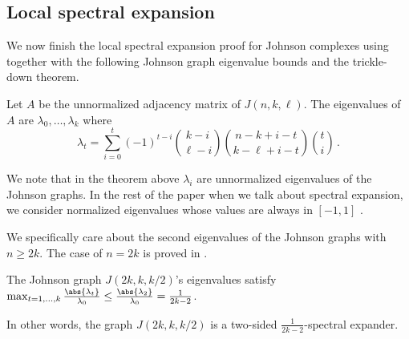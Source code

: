 



\subsection{Local spectral expansion}
We now finish the local spectral expansion proof for Johnson complexes using  together with the following Johnson graph eigenvalue bounds and the trickle-down theorem.

\begin{theorem}{\cite{DelsarteL1998}}
\label{thm:Johnson-graph-eigenvalue}
Let $A$ be the unnormalized adjacency matrix of \(J(n,k,\ell)\). The eigenvalues of $A$ are $\lambda_0,\dots,\lambda_k$ where 
\[\lambda_t = \sum_{i=0}^t (-1)^{t-i} \binom{k-i}{\ell-i} \binom{n-k+i-t}{k-\ell+i-t}\binom{t}{i} \,. \]
\end{theorem}
We note that in the theorem above $\lambda_i$ are unnormalized eigenvalues of the Johnson graphs. In the rest of the paper when we talk about spectral expansion, we consider normalized eigenvalues whose values are always in $[-1,1]$ . 

We specifically care about the second eigenvalues of the Johnson graphs with $n \ge 2k$. The case of $n = 2k$ is proved in \cite{Koshelev2023}.
\begin{lemma}{\cite{Koshelev2023}}\label{lem:Johnson-eigval-2k}
    The Johnson graph $J(2k,k,k/2)$'s eigenvalues satisfy $\max_{t=1,\dots,k} \frac{\abs{\lambda_t}}{\lambda_0}\le \frac{\abs{\lambda_2}}{\lambda_0} = \frac{1}{2k-2}$. 
\end{lemma}
In other words, the graph $J(2k,k,k/2)$ is a two-sided $\frac{1}{2k-2}$-spectral expander. 

